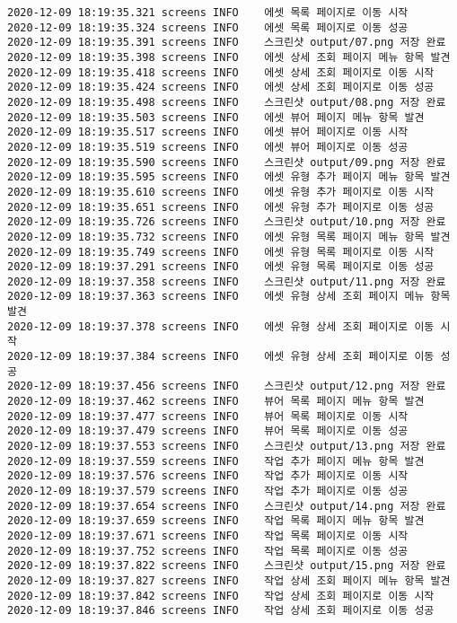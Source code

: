 \begin{Verbatim}[fontsize=\tiny, breaklines=true, breakanywhere=true]
2020-12-09 18:19:35.321 screens	INFO	에셋 목록 페이지로 이동 시작
2020-12-09 18:19:35.324 screens	INFO	에셋 목록 페이지로 이동 성공
2020-12-09 18:19:35.391 screens	INFO	스크린샷 output/07.png 저장 완료
2020-12-09 18:19:35.398 screens	INFO	에셋 상세 조회 페이지 메뉴 항목 발견
2020-12-09 18:19:35.418 screens	INFO	에셋 상세 조회 페이지로 이동 시작
2020-12-09 18:19:35.424 screens	INFO	에셋 상세 조회 페이지로 이동 성공
2020-12-09 18:19:35.498 screens	INFO	스크린샷 output/08.png 저장 완료
2020-12-09 18:19:35.503 screens	INFO	에셋 뷰어 페이지 메뉴 항목 발견
2020-12-09 18:19:35.517 screens	INFO	에셋 뷰어 페이지로 이동 시작
2020-12-09 18:19:35.519 screens	INFO	에셋 뷰어 페이지로 이동 성공
2020-12-09 18:19:35.590 screens	INFO	스크린샷 output/09.png 저장 완료
2020-12-09 18:19:35.595 screens	INFO	에셋 유형 추가 페이지 메뉴 항목 발견
2020-12-09 18:19:35.610 screens	INFO	에셋 유형 추가 페이지로 이동 시작
2020-12-09 18:19:35.651 screens	INFO	에셋 유형 추가 페이지로 이동 성공
2020-12-09 18:19:35.726 screens	INFO	스크린샷 output/10.png 저장 완료
2020-12-09 18:19:35.732 screens	INFO	에셋 유형 목록 페이지 메뉴 항목 발견
2020-12-09 18:19:35.749 screens	INFO	에셋 유형 목록 페이지로 이동 시작
2020-12-09 18:19:37.291 screens	INFO	에셋 유형 목록 페이지로 이동 성공
2020-12-09 18:19:37.358 screens	INFO	스크린샷 output/11.png 저장 완료
2020-12-09 18:19:37.363 screens	INFO	에셋 유형 상세 조회 페이지 메뉴 항목 발견
2020-12-09 18:19:37.378 screens	INFO	에셋 유형 상세 조회 페이지로 이동 시작
2020-12-09 18:19:37.384 screens	INFO	에셋 유형 상세 조회 페이지로 이동 성공
2020-12-09 18:19:37.456 screens	INFO	스크린샷 output/12.png 저장 완료
2020-12-09 18:19:37.462 screens	INFO	뷰어 목록 페이지 메뉴 항목 발견
2020-12-09 18:19:37.477 screens	INFO	뷰어 목록 페이지로 이동 시작
2020-12-09 18:19:37.479 screens	INFO	뷰어 목록 페이지로 이동 성공
2020-12-09 18:19:37.553 screens	INFO	스크린샷 output/13.png 저장 완료
2020-12-09 18:19:37.559 screens	INFO	작업 추가 페이지 메뉴 항목 발견
2020-12-09 18:19:37.576 screens	INFO	작업 추가 페이지로 이동 시작
2020-12-09 18:19:37.579 screens	INFO	작업 추가 페이지로 이동 성공
2020-12-09 18:19:37.654 screens	INFO	스크린샷 output/14.png 저장 완료
2020-12-09 18:19:37.659 screens	INFO	작업 목록 페이지 메뉴 항목 발견
2020-12-09 18:19:37.671 screens	INFO	작업 목록 페이지로 이동 시작
2020-12-09 18:19:37.752 screens	INFO	작업 목록 페이지로 이동 성공
2020-12-09 18:19:37.822 screens	INFO	스크린샷 output/15.png 저장 완료
2020-12-09 18:19:37.827 screens	INFO	작업 상세 조회 페이지 메뉴 항목 발견
2020-12-09 18:19:37.842 screens	INFO	작업 상세 조회 페이지로 이동 시작
2020-12-09 18:19:37.846 screens	INFO	작업 상세 조회 페이지로 이동 성공

\end{Verbatim}
